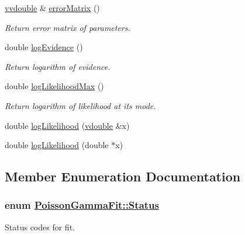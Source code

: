 \begin{CompactItemize}
\hyperlink{PoissonGammaFit_8hpp_a1}{vvdouble} \& \hyperlink{classPoissonGammaFit_a8}{error\-Matrix} ()
\begin{CompactList}\small\item\em Return error matrix of parameters. \item\end{CompactList}\item 
double \hyperlink{classPoissonGammaFit_a9}{log\-Evidence} ()
\begin{CompactList}\small\item\em Return logarithm of evidence. \item\end{CompactList}\item 
double \hyperlink{classPoissonGammaFit_a10}{log\-Likelihood\-Max} ()
\begin{CompactList}\small\item\em Return logarithm of likelihood at its mode. \item\end{CompactList}\item 
double \hyperlink{classPoissonGammaFit_a11}{log\-Likelihood} (\hyperlink{PoissonGammaFit_8hpp_a0}{vdouble} \&x)
\item 
double \hyperlink{classPoissonGammaFit_a12}{log\-Likelihood} (double $\ast$x)
\end{CompactItemize}


\subsection{Member Enumeration Documentation}
\hypertarget{classPoissonGammaFit_w7}{
\subsubsection[Status]{\setlength{\rightskip}{0pt plus 5cm}enum \hyperlink{classPoissonGammaFit_w7}{Poisson\-Gamma\-Fit::Status}}}
\label{classPoissonGammaFit_w7}


Status codes for fit. 

